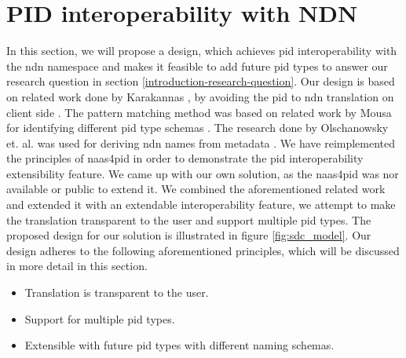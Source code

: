 \section{PID interoperability with NDN}
\label{pid-poc}


In this section, we will propose a design, which achieves \gls{pid} interoperability with the \gls{ndn} namespace and makes it feasible to add future \gls{pid} types to answer our research question in section \ref{introduction-research-question}. Our design is based on related work done by Karakannas \cite{icn-bd}, by avoiding the \gls{pid} to \gls{ndn} translation on client side \cite{icn-bd}. The pattern matching method was based on related work by Mousa for identifying different \gls{pid} type schemas \cite{ndn-app-aware}. The research done by Olschanowsky et. al. was used for deriving \gls{ndn} names from metadata \cite{ndn-man}.
We have reimplemented the principles of \gls{naas4pid} in order to demonstrate the \gls{pid} interoperability extensibility feature. We came up with our own solution, as the \gls{naas4pid} was nor available or public to extend it.
We combined the aforementioned related work and extended it with an extendable interoperability feature, we attempt to make the translation transparent to the user and support multiple \gls{pid} types. The proposed design for our solution is illustrated in figure \ref{fig:sdc_model}.
Our design adheres to the following aforementioned principles, which will be discussed in more detail in this section.
 
\begin{itemize}
    \item{Translation is transparent to the user.}
    \item{Support for multiple \gls{pid} types.}
    \item{Extensible with future \gls{pid} types with different naming schemas.}
\end{itemize}

